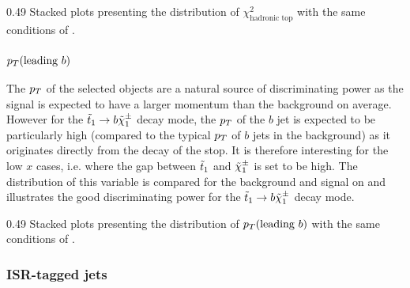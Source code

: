                      {0.49}
                     {Stacked plots presenting the distribution of $\chi^2_\text{hadronic top}$
                     with the same conditions of .}

        \subsubsection{$p_T(\text{leading } b)$}

        The $p_T$ of the selected objects are a natural source of discriminating power as
        the signal is expected to have a larger momentum than the background on average.
        However for the $\tilde{t}_1 \rightarrow b \tilde{\chi}_1^\pm$ decay mode, the $p_T$ of the
        $b$ jet is expected to be particularly high (compared to the typical $p_T$ of $b$ jets in the
        background) as it originates directly from the decay of the stop. It is therefore
        interesting for the low $x$ cases, i.e. where the gap between $\tilde{t}_1$ and
        $\tilde{\chi}_1^\pm$ is set to be high. The distribution of this variable is compared for
        the background and signal on  and illustrates the
        good discriminating power for the $\tilde{t}_1 \rightarrow b \tilde{\chi}_1^\pm$ decay mode.

                     {0.49}
                     {Stacked plots presenting the distribution of $p_T(\text{leading } b)$
                     with the same conditions of .}

        \subsubsection{ISR-tagged jets}

